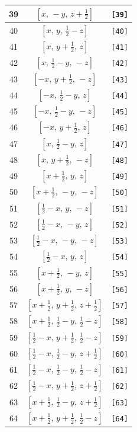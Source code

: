 \documentclass[fleqn,8pt]{jsarticle}
\begin{document}
\begin{longtable}{ccc}
39 & $\left[ x,\, - y,\, z + \frac{1}{2} \right]$ & {\tt [39]} \\ \hline
40 & $\left[ x,\, y,\, \frac{1}{2} - z \right]$ & {\tt [40]} \\ \hline
41 & $\left[ x,\, y + \frac{1}{2},\, z \right]$ & {\tt [41]} \\ \hline
42 & $\left[ x,\, \frac{1}{2} - y,\, - z \right]$ & {\tt [42]} \\ \hline
43 & $\left[ - x,\, y + \frac{1}{2},\, - z \right]$ & {\tt [43]} \\ \hline
44 & $\left[ - x,\, \frac{1}{2} - y,\, z \right]$ & {\tt [44]} \\ \hline
45 & $\left[ - x,\, \frac{1}{2} - y,\, - z \right]$ & {\tt [45]} \\ \hline
46 & $\left[ - x,\, y + \frac{1}{2},\, z \right]$ & {\tt [46]} \\ \hline
47 & $\left[ x,\, \frac{1}{2} - y,\, z \right]$ & {\tt [47]} \\ \hline
48 & $\left[ x,\, y + \frac{1}{2},\, - z \right]$ & {\tt [48]} \\ \hline
49 & $\left[ x + \frac{1}{2},\, y,\, z \right]$ & {\tt [49]} \\ \hline
50 & $\left[ x + \frac{1}{2},\, - y,\, - z \right]$ & {\tt [50]} \\ \hline
51 & $\left[ \frac{1}{2} - x,\, y,\, - z \right]$ & {\tt [51]} \\ \hline
52 & $\left[ \frac{1}{2} - x,\, - y,\, z \right]$ & {\tt [52]} \\ \hline
53 & $\left[ \frac{1}{2} - x,\, - y,\, - z \right]$ & {\tt [53]} \\ \hline
54 & $\left[ \frac{1}{2} - x,\, y,\, z \right]$ & {\tt [54]} \\ \hline
55 & $\left[ x + \frac{1}{2},\, - y,\, z \right]$ & {\tt [55]} \\ \hline
56 & $\left[ x + \frac{1}{2},\, y,\, - z \right]$ & {\tt [56]} \\ \hline
57 & $\left[ x + \frac{1}{2},\, y + \frac{1}{2},\, z + \frac{1}{2} \right]$ & {\tt [57]} \\ \hline
58 & $\left[ x + \frac{1}{2},\, \frac{1}{2} - y,\, \frac{1}{2} - z \right]$ & {\tt [58]} \\ \hline
59 & $\left[ \frac{1}{2} - x,\, y + \frac{1}{2},\, \frac{1}{2} - z \right]$ & {\tt [59]} \\ \hline
60 & $\left[ \frac{1}{2} - x,\, \frac{1}{2} - y,\, z + \frac{1}{2} \right]$ & {\tt [60]} \\ \hline
61 & $\left[ \frac{1}{2} - x,\, \frac{1}{2} - y,\, \frac{1}{2} - z \right]$ & {\tt [61]} \\ \hline
62 & $\left[ \frac{1}{2} - x,\, y + \frac{1}{2},\, z + \frac{1}{2} \right]$ & {\tt [62]} \\ \hline
63 & $\left[ x + \frac{1}{2},\, \frac{1}{2} - y,\, z + \frac{1}{2} \right]$ & {\tt [63]} \\ \hline
64 & $\left[ x + \frac{1}{2},\, y + \frac{1}{2},\, \frac{1}{2} - z \right]$ & {\tt [64]} \\
\end{longtable}
\end{document}
